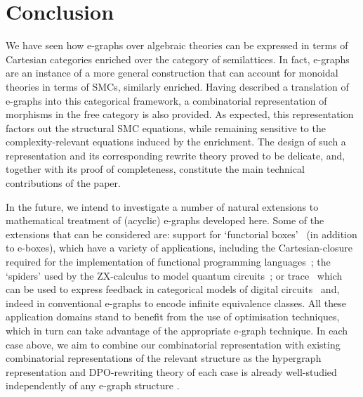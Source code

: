 \section{Conclusion}
\label{sec:conclusion}

We have seen how e-graphs over algebraic theories can be expressed in terms of Cartesian categories enriched over the category of semilattices. 
In fact, e-graphs are an instance of a more general construction that can account for monoidal theories in terms of SMCs,  similarly enriched.  
Having described a translation of e-graphs into this categorical framework, a combinatorial representation of morphisms in the free category is also provided. 
As expected, this representation factors out the structural SMC equations, while remaining sensitive to the complexity-relevant equations induced by the enrichment.  
The design of such a representation and its corresponding rewrite theory proved to be delicate, and, together with its proof of completeness, constitute the main technical contributions of the paper.  

In the future,  we intend to investigate a number of natural extensions to mathematical treatment of (acyclic) e-graphs developed here.
Some of the extensions that can be considered are: support for `functorial boxes'~\cite{mellies_functorial_2006} (in addition to e-boxes), which have a variety of applications, including the Cartesian-closure required for the implementation of functional programming languages~\cite{ghica-zanassi2023string};
the `spiders' used by the ZX-calculus to model quantum circuits~\cite{coecke_interacting_2011,ZX};
or trace~\cite{joyal_geometry_1991, Hasegawa-traced} which can be used to express feedback in categorical models of digital circuits~\cite{ghica_jung_2017,ghica_compositional_2023} and, indeed in conventional e-graphs to encode infinite equivalence classes.
All these application domains stand to benefit from the use of optimisation techniques, which in turn can take advantage of the appropriate e-graph technique.
In each case above,  we aim to combine our combinatorial representation with existing combinatorial representations of the relevant structure as the hypergraph representation and DPO-rewriting theory of each case is already well-studied independently of any e-graph structure \cite{ghica_rewriting_2023,alvarez-picallo-functorial_2021}.


